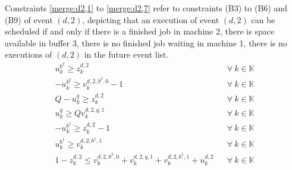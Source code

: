 \documentclass[suppldata]{interact}
\theoremstyle{plain}
\theoremstyle{definition}
\theoremstyle{remark}
\begin{document}
Constraints \eqref{merge:d2,1} to \eqref{merge:d2,7} refer to constraints (B3) to (B6) and (B9) of event ${(d,2)}$, depicting that an execution of event ${(d,2)}$ can be scheduled if and only if there is a finished job in machine 2, there is space available in buffer 3, there is no finished job waiting in machine 1, there is no executions of ${(d,2)}$ in the future event list. 
\begin{eqnarray}
	u^{b^2}_k\ge z^{d,2}_k&& \forall\ k\in \mathbb{K}\label{merge:d2,1}\\
	-u^{b^2}_k\ge v^{d,2,b^2,0}_k-1&& \forall\ k\in \mathbb{K}\label{merge:d2,2}\\
	Q-u^{q}_k\ge z^{d,2}_k&& \forall\ k\in \mathbb{K}\label{merge:d2,3}\\
	u^{q}_k\ge Qv^{d,2,q,1}_k&& \forall\ k\in \mathbb{K}\label{merge:d2,4}\\
	-u^{b^1}_k\ge z^{d,2}_k-1&& \forall\ k\in \mathbb{K}\label{merge:d2,5}\\
	u^{b^1}_k\ge v^{d,2,b^1,1}_k&& \forall\ k\in \mathbb{K}\label{merge:d2,6}\\
	1-z^{d,2}_k\le v^{d,2,b^2,0}_k+v^{d,2,q,1}_k+v^{d,2,b^1,1}_k+u^{d,2}_k&& \forall\ k\in \mathbb{K}\label{merge:d2,7}
\end{eqnarray}
\end{document}
